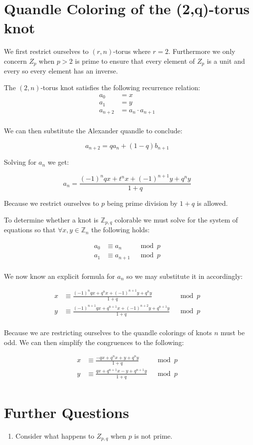 \documentclass[paper.tex]{subfiles}
\begin{document}
\section{Quandle Coloring of the (2,q)-torus knot}\label{sec:2ntorus}
We first restrict ourselves to $(r,n)$-torus where $r = 2$. Furthermore we only concern $Z_p$ when $p > 2$ is prime to ensure that every element of $Z_p$ is a unit and every so every element has an inverse.

The $(2,n)$-torus knot satisfies the following recurrence relation:
\begin{align*}
	a_0 &= x \\
	a_1 &= y \\
	a_{n+2} &= a_{n} \cdot a_{n+1} \\
\end{align*}

We can then substitute the Alexander quandle to conclude:

$$ a_{n+2} = qa_{n} + (1-q)b_{n+1} $$

Solving for $a_n$ we get:

$$ a_n = \frac{(-1)^nqx+t^nx+(-1)^{n+1}y+q^ny}{1+q} $$

Because we restrict ourselves to $p$ being prime division by $1+q$ is allowed.

To determine whether a knot is $\mathbb{Z}_{p,q}$ colorable we must solve for the system of equations so that $\forall x,y \in \mathbb{Z}_n$ the following holds:

\begin{align*}
	a_0 &\equiv a_{n}  & \mod{p} \\
	a_1 &\equiv a_{n+1} & \mod{p} \\
\end{align*}

We now know an explicit formula for $a_n$ so we may substitute it in accordingly:

\begin{align*}
	x &\equiv \frac{(-1)^nqx+q^nx+(-1)^{n+1}y+q^ny}{1+q} & \mod{p} \\
	y &\equiv \frac{(-1)^{n+1}qx+q^{n+1}x+(-1)^{n+2}y+q^{n+1}y}{1+q} & \mod{p} \\
\end{align*}

Because we are restricting ourselves to the quandle colorings of knots $n$ must be odd. We can then simplify the congruences to the following:

\begin{align*}
	x &\equiv \frac{-qx+q^nx+y+q^ny}{1+q} & \mod{p} \\
	y &\equiv \frac{qx+q^{n+1}x-y+q^{n+1}y}{1+q} & \mod{p} \\
\end{align*}

\section{Further Questions}\label{fqs}

\begin{enumerate}
	\item Consider what happens to $Z_{p,q}$ when $p$ is not prime.
\end{enumerate}



\end{document}
